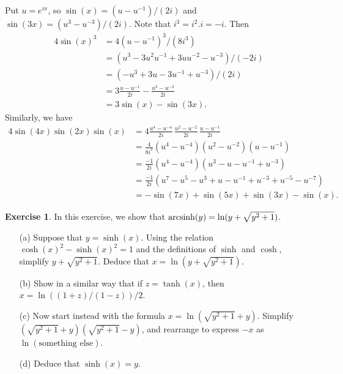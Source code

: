\documentclass[a4paper]{amsart}
\theoremstyle{definition}
\newtheorem{exercise}{Exercise}[section]
\newenvironment{solution}{{\noindent \bf Solution:}}{}
\begin{document}
\begin{solution}
Put $u=e^{ix}$, so $\sin(x)=(u-u^{-1})/(2i)$ and
 $\sin(3x)=(u^3-u^{-3})/(2i)$.  Note that $i^3=i^2.i=-i$.
 Then
 \begin{align*}
  4\sin(x)^3 &= 4(u-u^{-1})^3/(8i^3) \\
   &= (u^3-3u^2u^{-1}+3uu^{-2}-u^{-3})/(-2i) \\
   &= (-u^3+3u-3u^{-1}+u^{-3})/(2i) \\
   &= 3\frac{u-u^{-1}}{2i} - \frac{u^3-u^{-3}}{2i} \\
   &= 3\sin(x) - \sin(3x).
 \end{align*}
 Similarly, we have
 \begin{align*}
  4\sin(4x)\sin(2x)\sin(x) &= 
   4\frac{u^4-u^{-4}}{2i}\,\frac{u^2-u^{-2}}{2i}\,\frac{u-u^{-1}}{2i}
   \\
  &= \frac{4}{8i^3}(u^4-u^{-4})(u^2-u^{-2})(u-u^{-1}) \\
  &= \frac{-1}{2i}(u^4-u^{-4})(u^3-u-u^{-1}+u^{-3}) \\
  &= \frac{-1}{2i}(u^7-u^5-u^3+u-u^{-1}+u^{-3}+u^{-5}-u^{-7})\\
  &= -\sin(7x)+\sin(5x)+\sin(3x)-\sin(x).
 \end{align*}
\end{solution}
\begin{exercise}\label{ex-archyp}
In this exercise, we show that
 $\operatorname{arcsinh}(y)=\ln(y+\sqrt{y^2+1})$.
 \begin{itemize}
  \item[(a)] Suppose that $y=\sinh(x)$.  Using the relation
   $\cosh(x)^2-\sinh(x)^2=1$ and the definitions of $\sinh$
   and $\cosh$, simplify $y+\sqrt{y^2+1}$.  Deduce that
   $x=\ln(y+\sqrt{y^2+1})$. 
  \item[(b)] Show in a similar way that if $z=\tanh(x)$,
   then $x=\ln((1+z)/(1-z))/2$.
  \item[(c)] Now start instead with the formula
   $x=\ln(\sqrt{y^2+1}+y)$.  Simplify $(\sqrt{y^2+1}+y)(\sqrt{y^2+1}-y)$,
   and rearrange to express $-x$ as $\ln(\text{something else})$.
  \item[(d)] Deduce that $\sinh(x)=y$.
 \end{itemize}
\end{exercise}
\end{document}
